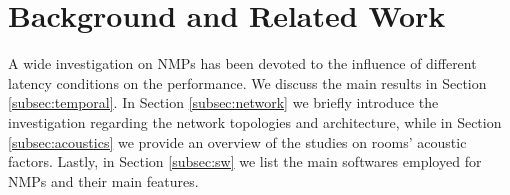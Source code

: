 \documentclass[conference]{IEEEtran}
\begin{document}
%
%
%
%


\section{Background and Related Work}\label{sec:background}
A wide investigation on NMPs has been devoted to the influence of different latency conditions on the performance. We discuss the main results in Section \ref{subsec:temporal}. In Section \ref{subsec:network} we briefly introduce the investigation regarding the network topologies and architecture, while in Section \ref{subsec:acoustics} we provide an overview of the studies on rooms' acoustic factors. Lastly, in Section \ref{subsec:sw} we list the main softwares employed for NMPs and their main features.
\end{document}

